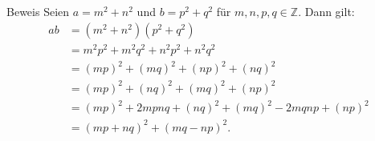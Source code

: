 \documentclass[10pt]{beamer}
\def\bZ{\mathbb{Z}}
\begin{document}
\begin{frame}{Beweis}
    Seien \( a = m^{2} + n^{2} \) und \( b = p^{2} + q^{2} \) für \( m, n, p, q \in \bZ \). Dann gilt:
    \begin{align*}
        ab
        & = \left( m^{2} + n^{2} \right) \left( p^{2} + q^{2} \right) \\
        & = m^{2}p^{2} + m^{2}q^{2} + n^{2}p^{2} + n^{2}q^{2} \\
        & = \left( mp \right)^{2} + \left( mq \right)^{2} + \left( np \right)^{2} + \left( nq \right)^{2} \\
        & = \left( mp \right)^{2} + \left( nq \right)^{2} + \left( mq \right)^{2} + \left( np \right)^{2} \\
        & = \left( mp \right)^{2} + 2mpnq + \left( nq \right)^{2} + \left( mq \right)^{2} - 2mqnp + \left( np \right)^{2} \\
        & = \left( mp + nq \right)^{2} + \left( mq - np \right)^{2}.
    \end{align*}
\end{frame}
\end{document}
